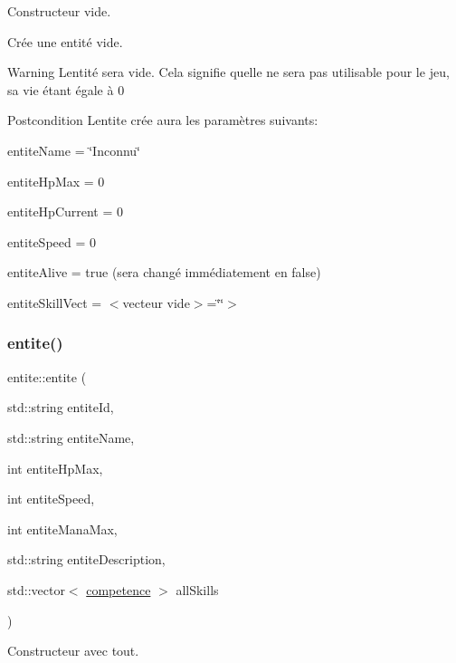 Constructeur vide. 

Crée une entité vide. \begin{DoxyWarning}{Warning}
L\textquotesingle{}entité sera vide. Cela signifie qu\textquotesingle{}elle ne sera pas utilisable pour le jeu, sa vie étant égale à 0 
\end{DoxyWarning}
\begin{DoxyPostcond}{Postcondition}
L\textquotesingle{}entite crée aura les paramètres suivants\+:
\begin{DoxyItemize}
\item entite\+Name = \char`\"{}\+Inconnu\char`\"{}
\item entite\+Hp\+Max = 0
\item entite\+Hp\+Current = 0
\item entite\+Speed = 0
\item entite\+Alive = true (sera changé immédiatement en false)
\item entite\+Skill\+Vect = $<$vecteur vide$>$=\char`\"{}\char`\"{}$>$ 
\end{DoxyItemize}
\end{DoxyPostcond}
\mbox{\label{classentite_a5e655b5c1999ae75dfca0b32de737b1e}} 
\subsubsection{\texorpdfstring{entite()}{entite()}\hspace{0.1cm}{\footnotesize\ttfamily [2/2]}}
{\footnotesize\ttfamily entite\+::entite (\begin{DoxyParamCaption}\item[{std\+::string}]{entite\+Id,  }\item[{std\+::string}]{entite\+Name,  }\item[{int}]{entite\+Hp\+Max,  }\item[{int}]{entite\+Speed,  }\item[{int}]{entite\+Mana\+Max,  }\item[{std\+::string}]{entite\+Description,  }\item[{std\+::vector$<$ \hyperlink{classcompetence}{competence} $>$}]{all\+Skills }\end{DoxyParamCaption})}



Constructeur avec tout. 


